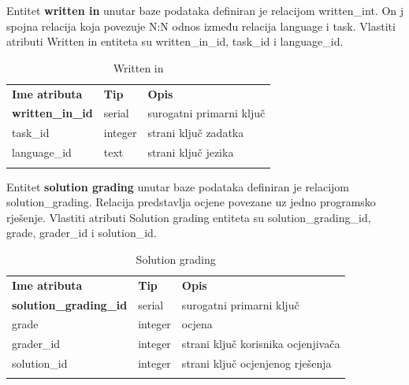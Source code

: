\documentclass[times, utf8, zavrsni]{fer}
\begin{document}
		Entitet \textbf{written in} unutar baze podataka definiran je relacijom written\_int. On j spojna relacija koja povezuje N:N odnos između relacija language i task. Vlastiti atributi Written in entiteta su written\_in\_id, task\_id i language\_id. 
		\begin{table}[H]
			\caption{Written in}
			\label{tbl:writtenin}
			\centering
			\begin{tabu} to \textwidth {XXX}
				\tabucline[1.75pt]{-}
				\textbf{Ime atributa} & \textbf{Tip} & \textbf{Opis}\\ 				
				\tabucline[1.75pt]{-}
				\textbf{written\_in\_id} & serial & surogatni primarni ključ\\ \hline
				task\_id & integer & strani ključ zadatka\\ \hline
				language\_id & text & strani ključ jezika\\ \hline
				\tabucline[1.75pt]{-}
			\end{tabu}
		\end{table}
		
		Entitet \textbf{solution grading} unutar baze podataka definiran je relacijom solution\_grading. Relacija predstavlja ocjene povezane uz jedno programsko rješenje. Vlastiti atributi Solution grading entiteta su solution\_grading\_id, grade, grader\_id i solution\_id. 
		\begin{table}[H]
			\caption{Solution grading}
			\label{tbl:solutiongrading}
			\centering
			\begin{tabu} to \textwidth {XXX}
				\tabucline[1.75pt]{-}
				\textbf{Ime atributa} & \textbf{Tip} & \textbf{Opis}\\ 				
				\tabucline[1.75pt]{-}
				\textbf{solution\_grading\_id} & serial & surogatni primarni ključ\\ \hline
				grade & integer & ocjena\\ \hline
				grader\_id & integer & strani ključ korisnika ocjenjivača\\ \hline
				solution\_id & integer & strani ključ ocjenjenog rješenja\\ \hline
				\tabucline[1.75pt]{-}
			\end{tabu}
		\end{table}
	
\end{document}
